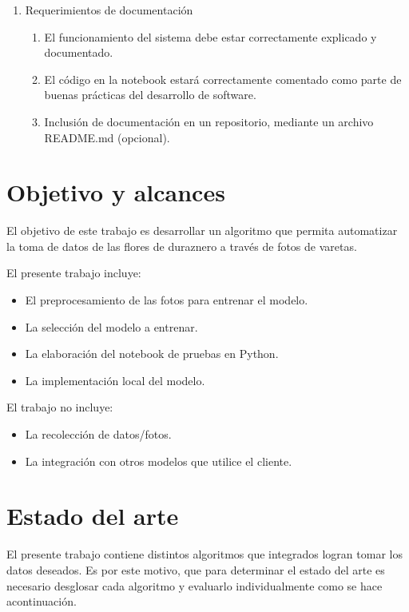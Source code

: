\begin{enumerate}
\begin{enumerate}
		\end{enumerate}
	\item Requerimientos de documentación
	\begin{enumerate}
			\item El funcionamiento del sistema debe estar correctamente explicado y documentado.
			 \item El código en la notebook estará correctamente comentado como parte de buenas prácticas del desarrollo de software.
			 \item Inclusión de documentación en un repositorio, mediante un archivo README.md (opcional).
		\end{enumerate}
\end{enumerate}

\section{Objetivo y alcances}

El objetivo de este trabajo es desarrollar un algoritmo que permita automatizar la toma de datos de las flores de duraznero a través de fotos de varetas.

El presente trabajo incluye:
\begin{itemize}
	\item El preprocesamiento de las fotos para entrenar el modelo.
	\item La selección del modelo a entrenar.
	\item La elaboración del notebook de pruebas en Python.
	\item La implementación local del modelo.
\end{itemize}

El trabajo no incluye:
\begin{itemize}
	\item La recolección de datos/fotos.
	\item La integración con otros modelos que utilice el cliente.
\end{itemize}



\section{Estado del arte}

El presente trabajo contiene distintos algoritmos que integrados logran tomar los datos deseados. Es por este motivo, que para determinar el estado del arte es necesario desglosar cada algoritmo y evaluarlo individualmente como se hace acontinuación.


